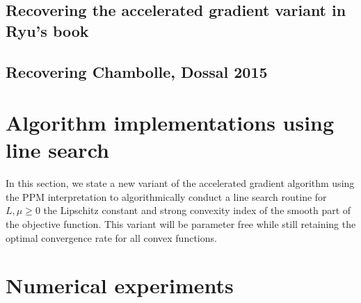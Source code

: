 \documentclass[12pt]{article}
\begin{document}
    \subsection{Recovering the accelerated gradient variant in Ryu's book}
        
    \subsection{Recovering Chambolle, Dossal 2015}
        

\section{Algorithm implementations using line search}\label{sec:algorithm_improved}
    In this section, we state a new variant of the accelerated gradient algorithm using the PPM interpretation to algorithmically conduct a line search routine for $L, \mu \ge 0$ the Lipschitz constant and strong convexity index of the smooth part of the objective function. 
    This variant will be parameter free while still retaining the optimal convergence rate for all convex functions. 

\section{Numerical experiments}\label{sec:numerical_experiments}

\appendix





\end{document}
